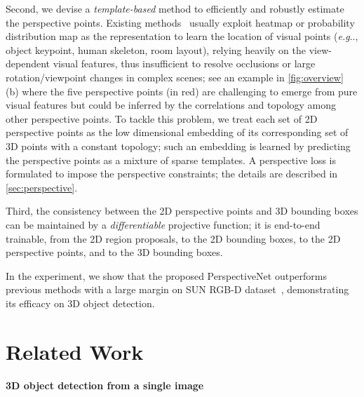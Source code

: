 \documentclass{article}
\makeatletter
\DeclareRobustCommand\onedot{\futurelet\@let@token\@onedot}
\def\@onedot{\ifx\@let@token.\else.\null\fi\xspace}
\def\eg{\emph{e.g}\onedot} \def\Eg{\emph{E.g}\onedot}
\makeatother
\begin{document}
Second, we devise a \emph{template-based} method to efficiently and robustly estimate the perspective points. Existing methods~\cite{newell2016stacked,lee2017roomnet,zou2018layoutnet,he2017mask,suwajanakorn2018discovery} usually exploit heatmap or probability distribution map as the representation to learn the location of visual points (\eg, object keypoint, human skeleton, room layout), relying heavily on the view-dependent visual features, thus insufficient to resolve occlusions or large rotation/viewpoint changes in complex scenes; see an example in \autoref{fig:overview} (b) where the five perspective points (in red) are challenging to emerge from pure visual features but could be inferred by the correlations and topology among other perspective points. To tackle this problem, we treat each set of 2D perspective points as the low dimensional embedding of its corresponding set of 3D points with a constant topology; such an embedding is learned by predicting the perspective points as a mixture of sparse templates. A perspective loss is formulated to impose the perspective constraints; the details are described in \autoref{sec:perspective}.

Third, the consistency between the 2D perspective points and 3D bounding boxes can be maintained by a \emph{differentiable} projective function; it is end-to-end trainable, from the 2D region proposals, to the 2D bounding boxes, to the 2D perspective points, and to the 3D bounding boxes.

In the experiment, we show that the proposed PerspectiveNet outperforms previous methods with a large margin on SUN RGB-D dataset~\cite{song2015sun}, demonstrating its efficacy on 3D object detection.


\section{Related Work}

\paragraph{3D object detection from a single image}
\end{document}
